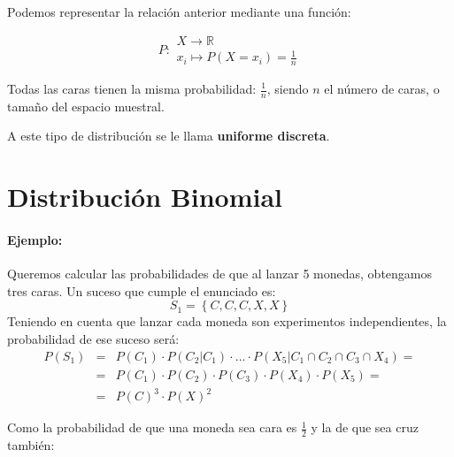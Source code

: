 Podemos representar la relación anterior mediante una función:

%
%

$$P\colon \begin{array}{ll} 
          X \rightarrow \mathbb{R} \\ 
          x_i\mapsto P(X=x_i)=\frac{1}{n} 
         \end{array}$$

Todas las caras tienen la misma probabilidad: $\frac{1}{n}$, siendo $n$ el número de caras, o tamaño del espacio muestral. 

A este tipo de distribución se le llama \textbf{uniforme discreta}.

\section{Distribución Binomial}

\paragraph{Ejemplo:} Queremos calcular las probabilidades de que al lanzar 5 monedas, obtengamos tres caras.
Un suceso que cumple el enunciado es:
$$S_1=\left\lbrace C,C,C,X,X \right\rbrace$$
Teniendo en cuenta que lanzar cada moneda son experimentos independientes, la probabilidad de ese suceso será:
\begin{eqnarray*}
P\left(S_1\right) & = &P\left(C_1\right)\cdot P\left(C_2 | C_1 \right)\cdot ... \cdot P\left(X_5 | C_1 \cap C_2  \cap C_3  \cap X_4   \right)= \\ &  = & P\left(C_1\right)\cdot  P\left(C_2\right) \cdot P\left(C_3\right) \cdot P\left(X_4\right) \cdot P\left(X_5\right)= \\
& = & P\left(C\right)^3\cdot  P\left(X\right)^2
\end{eqnarray*}

Como la probabilidad de que una moneda sea cara es $\frac{1}{2}$ y la de que sea cruz también:

